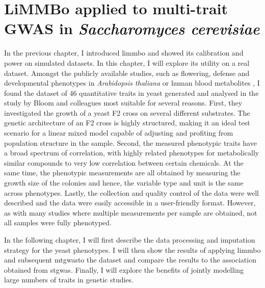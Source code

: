 \chapter{LiMMBo applied to multi-trait GWAS  in \emph{Saccharomyces cerevisiae}}
\label{chapter:yeast}
In the previous chapter, I introduced \gls{limmbo} and showed its calibration and power on simulated datasets. In this chapter, I will explore its utility on a real dataset. Amongst the publicly available studies, such as flowering, defense and developmental phenotypes in \textit{Arabidopsis thaliana} \citep{Atwell2010} or human blood metabolites \citep{Shin2014}, I found the dataset of 46 quantitative traits in yeast generated and analysed in the study by Bloom and colleagues \citep{Bloom2013} most suitable for several reasons. First, they investigated the growth of a yeast F2 cross on several different substrates.  The genetic architecture of an F2 cross is highly structured, making it an ideal test scenario for a linear mixed model capable of adjusting and profiting from population structure in the sample. Second, the measured phenotypic traits have a broad spectrum of correlation, with highly related phenotypes for metabolically similar compounds to very low correlation between certain chemicals. At the same time, the phenotypic measurements are all obtained by measuring the growth size of the colonies and hence, the variable type and unit is the same across phenotypes. Lastly, the collection and quality control of the data were well described and the data were easily accessible in a user-friendly format. However, as with many studies where multiple measurements per sample are obtained, not all samples were fully phenotyped. 

In the following chapter, I will first describe the data processing and imputation strategy for the yeast phenotypes. I will then show the results of applying \gls{limmbo} and subsequent \gls{mtgwas}to the dataset and compare the results to the association obtained from \gls{stgwas}. Finally, I will explore the benefits of jointly modelling large numbers of traits in genetic studies.

